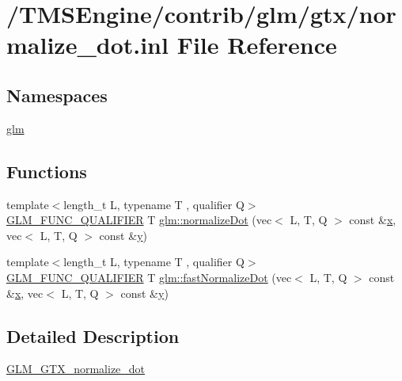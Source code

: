 \hypertarget{normalize__dot_8inl}{}\section{/\+T\+M\+S\+Engine/contrib/glm/gtx/normalize\+\_\+dot.inl File Reference}
\label{normalize__dot_8inl}
\subsection*{Namespaces}
\begin{DoxyCompactItemize}
\item 
 \hyperlink{namespaceglm}{glm}
\end{DoxyCompactItemize}
\subsection*{Functions}
\begin{DoxyCompactItemize}
\item 
{\footnotesize template$<$length\+\_\+t L, typename T , qualifier Q$>$ }\\\hyperlink{setup_8hpp_a33fdea6f91c5f834105f7415e2a64407}{G\+L\+M\+\_\+\+F\+U\+N\+C\+\_\+\+Q\+U\+A\+L\+I\+F\+I\+ER} T \hyperlink{group__gtx__normalize__dot_gacb140a2b903115d318c8b0a2fb5a5daa}{glm\+::normalize\+Dot} (vec$<$ L, T, Q $>$ const \&\hyperlink{_s_d_l__opengl_8h_ad0e63d0edcdbd3d79554076bf309fd47}{x}, vec$<$ L, T, Q $>$ const \&\hyperlink{_s_d_l__opengl_8h_a1675d9d7bb68e1657ff028643b4037e3}{y})
\item 
{\footnotesize template$<$length\+\_\+t L, typename T , qualifier Q$>$ }\\\hyperlink{setup_8hpp_a33fdea6f91c5f834105f7415e2a64407}{G\+L\+M\+\_\+\+F\+U\+N\+C\+\_\+\+Q\+U\+A\+L\+I\+F\+I\+ER} T \hyperlink{group__gtx__normalize__dot_ga2746fb9b5bd22b06b2f7c8babba5de9e}{glm\+::fast\+Normalize\+Dot} (vec$<$ L, T, Q $>$ const \&\hyperlink{_s_d_l__opengl_8h_ad0e63d0edcdbd3d79554076bf309fd47}{x}, vec$<$ L, T, Q $>$ const \&\hyperlink{_s_d_l__opengl_8h_a1675d9d7bb68e1657ff028643b4037e3}{y})
\end{DoxyCompactItemize}


\subsection{Detailed Description}
\hyperlink{group__gtx__normalize__dot}{G\+L\+M\+\_\+\+G\+T\+X\+\_\+normalize\+\_\+dot} 